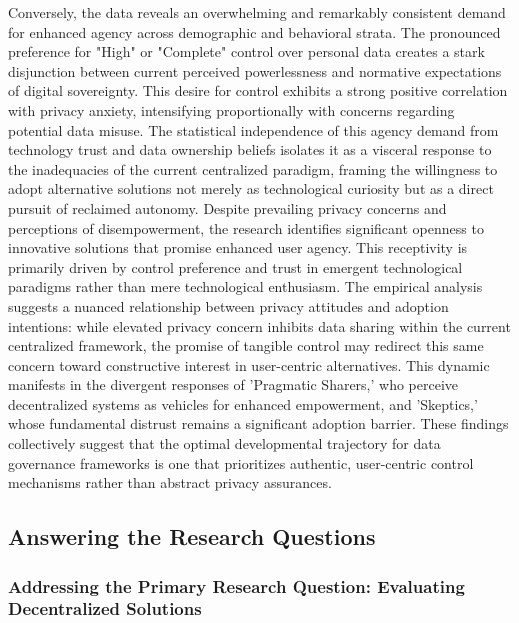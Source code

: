 	Conversely, the data reveals an overwhelming and remarkably consistent demand for enhanced agency across demographic and behavioral strata. The pronounced preference for "High" or "Complete" control over personal data creates a stark disjunction between current perceived powerlessness and normative expectations of digital sovereignty. This desire for control exhibits a strong positive correlation with privacy anxiety, intensifying proportionally with concerns regarding potential data misuse. The statistical independence of this agency demand from technology trust and data ownership beliefs isolates it as a visceral response to the inadequacies of the current centralized paradigm, framing the willingness to adopt alternative solutions not merely as technological curiosity but as a direct pursuit of reclaimed autonomy.
	Despite prevailing privacy concerns and perceptions of disempowerment, the research identifies significant openness to innovative solutions that promise enhanced user agency. This receptivity is primarily driven by control preference and trust in emergent technological paradigms rather than mere technological enthusiasm. The empirical analysis suggests a nuanced relationship between privacy attitudes and adoption intentions: while elevated privacy concern inhibits data sharing within the current centralized framework, the promise of tangible control may redirect this same concern toward constructive interest in user-centric alternatives. This dynamic manifests in the divergent responses of 'Pragmatic Sharers,' who perceive decentralized systems as vehicles for enhanced empowerment, and 'Skeptics,' whose fundamental distrust remains a significant adoption barrier. These findings collectively suggest that the optimal developmental trajectory for data governance frameworks is one that prioritizes authentic, user-centric control mechanisms rather than abstract privacy assurances.
\subsection{Answering the Research Questions}
	\subsubsection{Addressing the Primary Research Question: Evaluating Decentralized Solutions}

